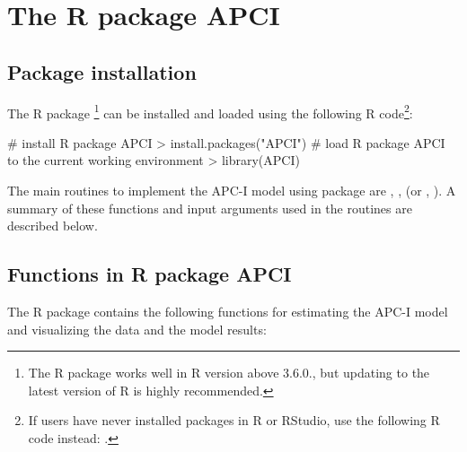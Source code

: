 \section{The R package APCI} \label{pacakge}

\subsection{Package installation} \label{install}

The R package  \footnote{The R package  works well in R version above 3.6.0., but updating to the latest version of R is highly recommended.} can be installed and loaded using the following R code\footnote{If users have never installed packages in R or RStudio, use the following R code instead: .                                           }:
\begin{example}
# install R package APCI
> install.packages("APCI")
# load R package APCI to the current working environment 
> library(APCI)
\end{example}

The main routines to implement the APC-I model using package  are , ,  (or , ). A summary of these functions and input arguments used in the routines are described below.

\subsection{Functions in R package APCI} \label{functions}

The R package  contains the following functions for estimating the APC-I model and visualizing the data and the model results:

